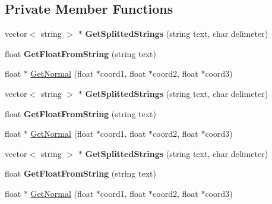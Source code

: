 \subsection*{Private Member Functions}
\begin{DoxyCompactItemize}
\item 
\mbox{\label{class_obj_model_loader_a83b99c2d462f9e4f031ef200d5330647}} 
vector$<$ string $>$ $\ast$ {\bfseries Get\+Splitted\+Strings} (string text, char delimeter)
\item 
\mbox{\label{class_obj_model_loader_aa3fb4cc6287719936e0aadadbee23074}} 
float {\bfseries Get\+Float\+From\+String} (string text)
\item 
float $\ast$ \mbox{\hyperlink{class_obj_model_loader_a6b2aa4e718570359e6b654ad948c0aa3}{Get\+Normal}} (float $\ast$coord1, float $\ast$coord2, float $\ast$coord3)
\item 
\mbox{\label{class_obj_model_loader_a09572365c5686cd5fe7c967c954ff2a2}} 
vector$<$ string $>$ $\ast$ {\bfseries Get\+Splitted\+Strings} (string text, char delimeter)
\item 
\mbox{\label{class_obj_model_loader_aa3fb4cc6287719936e0aadadbee23074}} 
float {\bfseries Get\+Float\+From\+String} (string text)
\item 
float $\ast$ \mbox{\hyperlink{class_obj_model_loader_ab7e5baa8ba27e56f828e1591f199f41b}{Get\+Normal}} (float $\ast$coord1, float $\ast$coord2, float $\ast$coord3)
\item 
\mbox{\label{class_obj_model_loader_a09572365c5686cd5fe7c967c954ff2a2}} 
vector$<$ string $>$ $\ast$ {\bfseries Get\+Splitted\+Strings} (string text, char delimeter)
\item 
\mbox{\label{class_obj_model_loader_aa3fb4cc6287719936e0aadadbee23074}} 
float {\bfseries Get\+Float\+From\+String} (string text)
\item 
float $\ast$ \mbox{\hyperlink{class_obj_model_loader_ab7e5baa8ba27e56f828e1591f199f41b}{Get\+Normal}} (float $\ast$coord1, float $\ast$coord2, float $\ast$coord3)
\end{DoxyCompactItemize}
